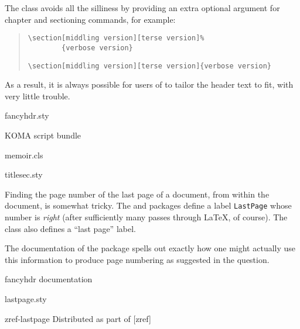 The  class avoids all the silliness by providing an
extra optional argument for chapter and sectioning commands, for
example:
\begin{quote}
\begin{narrowversion}
\begin{verbatim}
\section[middling version][terse version]%
        {verbose version}
\end{verbatim}
\end{narrowversion}
\begin{wideversion}
\begin{verbatim}
\section[middling version][terse version]{verbose version}
\end{verbatim}
\end{wideversion}
\end{quote}
As a result, it is always possible for users of  to
tailor the header text to fit, with very little trouble.
\begin{ctanrefs}
\item[fancyhdr.sty]
\item[\nothtml{\rmfamily}KOMA script bundle]
\item[memoir.cls]
\item[titlesec.sty]
\end{ctanrefs}

\nothtml{\begingroup\boldmath}
\nothtml{\afterquestion}

Finding the page number of the last page of a document, from within
the document, is somewhat tricky.  The  and
 packages define a label
\texttt{LastPage} whose number is \emph{right} (after sufficiently many
passes through \LaTeX{}, of course).  The  class also
defines a ``last page'' label.

The documentation of the  package spells out exactly
how one might actually use this information to produce page numbering
as suggested in the question.
\begin{ctanrefs}
\item[\nothtml{\rmfamily}fancyhdr documentation]
\item[lastpage.sty]
\item[zref-lastpage]Distributed as part of [zref]
\end{ctanrefs}

